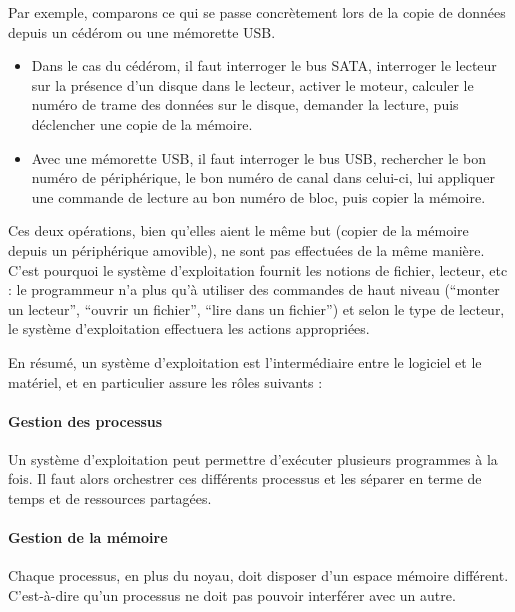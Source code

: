 Par exemple, comparons ce qui se passe concrètement lors de la copie de données
depuis un cédérom ou une mémorette USB.

\begin{itemize}

  \item Dans le cas du cédérom, il faut interroger le bus SATA, interroger le
    lecteur sur la présence d'un disque dans le lecteur, activer le moteur,
    calculer le numéro de trame des données sur le disque, demander la lecture,
    puis déclencher une
    copie de la mémoire.

  \item Avec une mémorette USB, il faut interroger le bus USB, rechercher le bon
    numéro de périphérique, le bon numéro de canal dans celui-ci, lui appliquer
    une commande de lecture au bon numéro de bloc, puis copier la mémoire.

\end{itemize}

Ces deux opérations, bien qu'elles aient le même but (copier de la mémoire
depuis un périphérique amovible), ne sont pas effectuées de la même manière.
C'est pourquoi le système d'exploitation fournit les notions de fichier,
lecteur, etc : le programmeur n'a plus qu'à utiliser des commandes de haut
niveau (``monter un lecteur'', ``ouvrir un fichier'', ``lire dans un fichier'')
et selon le type de lecteur, le système d'exploitation effectuera les actions
appropriées.

En résumé, un système d'exploitation est l'intermédiaire entre le logiciel et
le matériel, et en particulier assure les rôles suivants :


\paragraph{Gestion des processus}

Un système d'exploitation peut permettre d'exécuter plusieurs programmes à la
fois. Il faut alors orchestrer ces différents processus et les séparer en terme
de temps et de ressources partagées.

\paragraph{Gestion de la mémoire}

Chaque processus, en plus du noyau, doit disposer d'un espace mémoire différent.
C'est-à-dire qu'un processus ne doit pas pouvoir interférer avec un autre.

